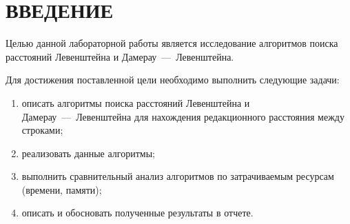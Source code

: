 \chapter*{\hfill{\centering  ВВЕДЕНИЕ}\hfill}

Целью данной лабораторной работы является исследование алгоритмов поиска расстояний Левенштейна и Дамерау~---~Левенштейна.

Для достижения поставленной цели необходимо выполнить следующие задачи:
\begin{enumerate}
    \item описать алгоритмы поиска расстояний Левенштейна и Дамерау~---~Левенштейна для нахождения редакционного расстояния между строками;
    \item реализовать данные алгоритмы;
    \item выполнить сравнительный анализ алгоритмов по затрачиваемым ресурсам (времени, памяти);
    \item описать и обосновать полученные результаты в отчете.
\end{enumerate}
